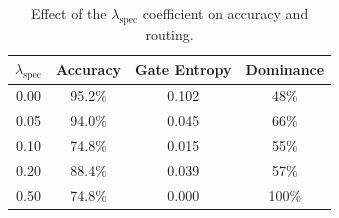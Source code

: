 \begin{table}[h]
\centering
\caption{Effect of the $\lambda_\text{spec}$ coefficient on accuracy and routing.}
\begin{tabular}{c c c c}
\hline
$\lambda_\text{spec}$ & \textbf{Accuracy} & \textbf{Gate Entropy} & \textbf{Dominance} \\
\hline
0.00 & 95.2\% & 0.102 & 48\% \\
0.05 & 94.0\% & 0.045 & 66\% \\
0.10 & 74.8\% & 0.015 & 55\% \\
0.20 & 88.4\% & 0.039 & 57\% \\
0.50 & 74.8\% & 0.000 & 100\% \\
\hline
\end{tabular}
\end{table}
